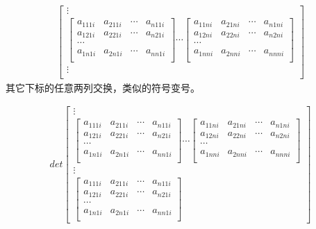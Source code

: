 \documentclass[twoside,a4paper,CCT]{cctart}   %
\begin{document}
\begin{list}{}
\begin{align*}
\begin{bmatrix}
\vdots\\
 \begin{bmatrix}
   a_{111i}& a_{211i}&\cdots&a_{n11i}\\
   a_{121i}& a_{221i}&\cdots&a_{n21i}\\
 \cdots\\
a_{1n1i}& a_{2n1i}&\cdots&a_{nn1i}\\
\end{bmatrix}
\cdots
\begin{bmatrix}
  a_{11ni}& a_{21ni}&\cdots&a_{n1ni}\\
  a_{12ni}& a_{22ni}&\cdots&a_{n2ni}\\
 \cdots\\
  a_{1nni}& a_{2nni}&\cdots&a_{nnni}\\
  \end{bmatrix}\\
\vdots\\
    \end{bmatrix}
\end{align*}
 其它下标的任意两列交换，类似的符号变号。
 \item
\begin{align*}
det
  \begin{bmatrix}
\vdots\\
 \begin{bmatrix}
 a_{111i}& a_{211i}&\cdots&a_{n11i}\\
 a_{121i}& a_{221i}&\cdots&a_{n21i}\\
 \cdots\\
a_{1n1i}& a_{2n1i}&\cdots&a_{nn1i}\\
\end{bmatrix}
\cdots
\begin{bmatrix}
  a_{11ni}& a_{21ni}&\cdots&a_{n1ni}\\
  a_{12ni}& a_{22ni}&\cdots&a_{n2ni}\\
 \cdots\\
 a_{1nni}& a_{2nni}&\cdots&a_{nnni}\\
 \end{bmatrix}\\
\vdots\\
\begin{bmatrix}
  a_{111i}& a_{211i}&\cdots&a_{n11i}\\
  a_{121i}& a_{221i}&\cdots&a_{n21i}\\
   \cdots\\
   a_{1n1i}& a_{2n1i}&\cdots&a_{nn1i}\\
   \end{bmatrix}

\end{bmatrix}
\end{align*}
\end{list}
\end{document}
